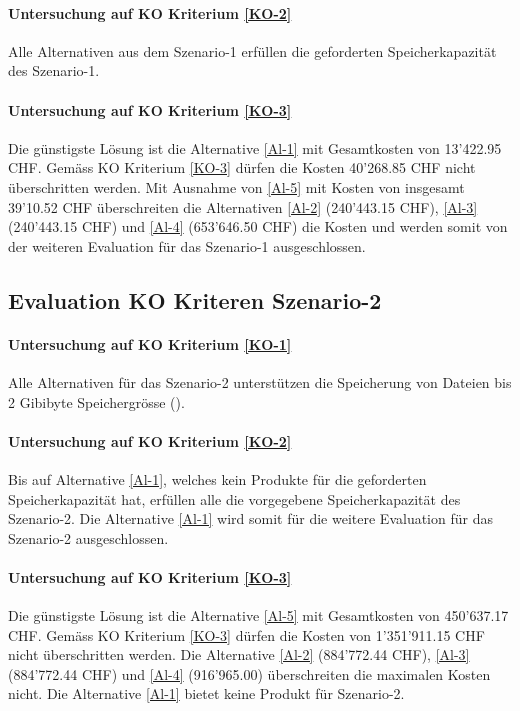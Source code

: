 \paragraph*{Untersuchung auf KO Kriterium \ref{KO-2}}
Alle Alternativen aus dem Szenario-1 erfüllen die geforderten Speicherkapazität des Szenario-1.

\paragraph*{Untersuchung auf KO Kriterium \ref{KO-3}}
Die günstigste Lösung ist die Alternative \ref{Al-1} mit Gesamtkosten von 13'422.95 CHF. Gemäss KO Kriterium \ref{KO-3} dürfen die Kosten 40'268.85 CHF nicht überschritten werden. Mit Ausnahme von \ref{Al-5} mit Kosten von insgesamt 39'10.52 CHF überschreiten die Alternativen \ref{Al-2} (240’443.15 CHF), \ref{Al-3} (240’443.15 CHF) und \ref{Al-4} (653’646.50 CHF) die Kosten und werden somit von der weiteren Evaluation für das Szenario-1 ausgeschlossen.

\subsection{Evaluation KO Kriteren Szenario-2}

\paragraph*{Untersuchung auf KO Kriterium \ref{KO-1}}
Alle Alternativen für das Szenario-2 unterstützen die Speicherung von Dateien bis 2 Gibibyte Speichergrösse ().

\paragraph*{Untersuchung auf KO Kriterium \ref{KO-2}}
Bis auf Alternative \ref{Al-1}, welches kein Produkte für die geforderten Speicherkapazität hat, erfüllen alle die vorgegebene Speicherkapazität des Szenario-2. Die Alternative \ref{Al-1} wird somit für die weitere Evaluation für das Szenario-2 ausgeschlossen.

\paragraph*{Untersuchung auf KO Kriterium \ref{KO-3}}
Die günstigste Lösung ist die Alternative  \ref{Al-5}  mit Gesamtkosten von 450'637.17 CHF. Gemäss KO Kriterium \ref{KO-3} dürfen die Kosten von 1'351'911.15 CHF nicht überschritten werden. Die Alternative \ref{Al-2} (884’772.44 CHF), \ref{Al-3} (884’772.44 CHF) und \ref{Al-4} (916’965.00) überschreiten die maximalen Kosten nicht. Die Alternative \ref{Al-1} bietet keine Produkt für Szenario-2.

